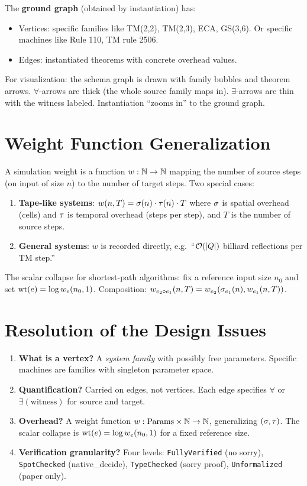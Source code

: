 The \textbf{ground graph} (obtained by instantiation) has:
\begin{itemize}
\item Vertices: specific families like TM(2,2), TM(2,3), ECA, GS(3,6).
  Or specific machines like Rule 110, TM rule 2506.
\item Edges: instantiated theorems with concrete overhead values.
\end{itemize}

For visualization: the schema graph is drawn with family bubbles and theorem
arrows. $\forall$-arrows are thick (the whole source family maps in). $\exists$-arrows
are thin with the witness labeled. Instantiation ``zooms in'' to the ground
graph.

\section{Weight Function Generalization}

\begin{definition}\label{sim-weight}
\notready
A simulation weight is a function $w : \mathbb{N} \to \mathbb{N}$ mapping the number of
source steps (on input of size $n$) to the number of target steps. Two
special cases:
\begin{enumerate}
\item \textbf{Tape-like systems}: $w(n, T) = \sigma(n) \cdot \tau(n) \cdot T$
  where $\sigma$ is spatial overhead (cells) and $\tau$ is temporal overhead
  (steps per step), and $T$ is the number of source steps.
\item \textbf{General systems}: $w$ is recorded directly, e.g.\
  ``$\mathcal{O}(|Q|)$ billiard reflections per TM step.''
\end{enumerate}
\end{definition}

The scalar collapse for shortest-path algorithms: fix a reference input size
$n_0$ and set $\mathrm{wt}(e) = \log w_e(n_0, 1)$. Composition: $w_{e_2 \circ e_1}(n, T)
= w_{e_2}(\sigma_{e_1}(n), w_{e_1}(n, T))$.

\section{Resolution of the Design Issues}

\begin{enumerate}
\item \textbf{What is a vertex?} A \emph{system family} with possibly
  free parameters. Specific machines are families with singleton parameter space.
\item \textbf{Quantification?} Carried on edges, not vertices. Each edge
  specifies $\forall$ or $\exists(\text{witness})$ for source and target.
\item \textbf{Overhead?} A weight function $w : \mathrm{Params} \times \mathbb{N} \to \mathbb{N}$,
  generalizing $(\sigma, \tau)$. The scalar collapse is $\mathrm{wt}(e) = \log w_e(n_0, 1)$
  for a fixed reference size.
\item \textbf{Verification granularity?} Four levels:
  \texttt{FullyVerified} (no sorry),
  \texttt{SpotChecked} (native\_decide),
  \texttt{TypeChecked} (sorry proof),
  \texttt{Unformalized} (paper only).
\end{enumerate}
